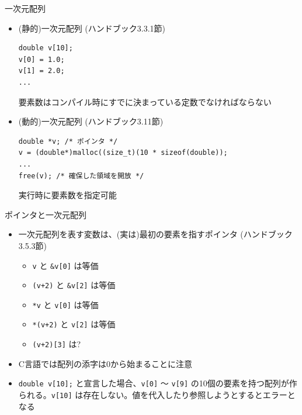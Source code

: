 \documentclass[dvipdfmx]{beamer}
\begin{document}
\begin{frame}[t,fragile]{一次元配列}
  \begin{itemize}
    \setlength{\itemsep}{1em}
  \item (静的)一次元配列 (ハンドブック3.3.1節)
\begin{lstlisting}
double v[10];
v[0] = 1.0;
v[1] = 2.0;
...
\end{lstlisting}
    要素数はコンパイル時にすでに決まっている定数でなければならない
  \item (動的)一次元配列 (ハンドブック3.11節)
\begin{lstlisting}
double *v; /* ポインタ */
v = (double*)malloc((size_t)(10 * sizeof(double));
...
free(v); /* 確保した領域を開放 */
\end{lstlisting}
実行時に要素数を指定可能
  \end{itemize}
\end{frame}

\begin{frame}[t,fragile]{ポインタと一次元配列}
  \begin{itemize}
    \setlength{\itemsep}{1em}
  \item 一次元配列を表す変数は、(実は)最初の要素を指すポインタ  (ハンドブック3.5.3節)
    \begin{itemize}
    \item \verb+v+ と \verb+&v[0]+ は等価
    \item \verb^(v+2)^ と \verb^&v[2]^ は等価
    \item \verb+*v+ と \verb+v[0]+ は等価
    \item \verb^*(v+2)^ と \verb^v[2]^ は等価
    \item \verb^(v+2)[3]^ は?
    \end{itemize}
  \item C言語では配列の添字は0から始まることに注意
  \item \verb^double v[10];^ と宣言した場合、\verb^v[0]^ 〜 \verb^v[9]^ の10個の要素を持つ配列が作られる。\verb^v[10]^ は存在しない。値を代入したり参照しようとするとエラーとなる
  \end{itemize}
\end{frame}
\end{document}
